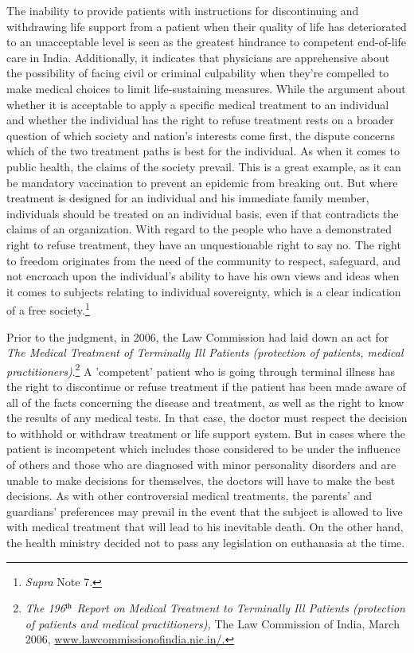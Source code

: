 \begin{multicols}{2}
\noi
The inability to provide patients with instructions for discontinuing and withdrawing life
support from a patient when their quality of life has deteriorated to an unacceptable level is
seen as the greatest hindrance to competent end-of-life care in India. Additionally, it indicates
that physicians are apprehensive about the possibility of facing civil or criminal culpability
when they're compelled to make medical choices to limit life-sustaining measures. While the  
argument about whether it is acceptable to apply a specific medical treatment to an individual
and whether the individual has the right to refuse treatment rests on a broader question of
which society and nation's interests come first, the dispute concerns which of the two
treatment paths is best for the individual. As when it comes to public health, the claims of the
society prevail. This is a great example, as it can be mandatory vaccination to prevent an
epidemic from breaking out. But where treatment is designed for an individual and his
immediate family member, individuals should be treated on an individual basis, even if that
contradicts the claims of an organization. With regard to the people who have a demonstrated
right to refuse treatment, they have an unquestionable right to say no. The right to freedom
originates from the need of the community to respect, safeguard, and not encroach upon the
individual's ability to have his own views and ideas when it comes to subjects relating to
individual sovereignty, which is a clear indication of a free society.\footnote{\textit{Supra} Note 7.}

\noi
Prior to the judgment, in 2006, the Law Commission had laid down an act for \textit{The Medical
Treatment of Terminally Ill Patients (protection of patients, medical practitioners)}.\footnote{\textit{The 196$^{\rm th}$ Report on Medical Treatment to Terminally Ill Patients (protection of patients and medical
practitioners),} The Law Commission of India, March 2006, \url{www.lawcommissionofindia.nic.in/.}} A
'competent' patient who is going through terminal illness has the right to discontinue or refuse
treatment if the patient has been made aware of all of the facts concerning the disease and
treatment, as well as the right to know the results of any medical tests. In that case, the doctor
must respect the decision to withhold or withdraw treatment or life support system. But in
cases where the patient is incompetent which includes those considered to be under the
influence of others and those who are diagnosed with minor personality disorders and are
unable to make decisions for themselves, the doctors will have to make the best decisions. As
with other controversial medical treatments, the parents' and guardians' preferences may
prevail in the event that the subject is allowed to live with medical treatment that will lead to
his inevitable death. On the other hand, the health ministry decided not to pass any legislation
on euthanasia at the time.


\end{multicols}
